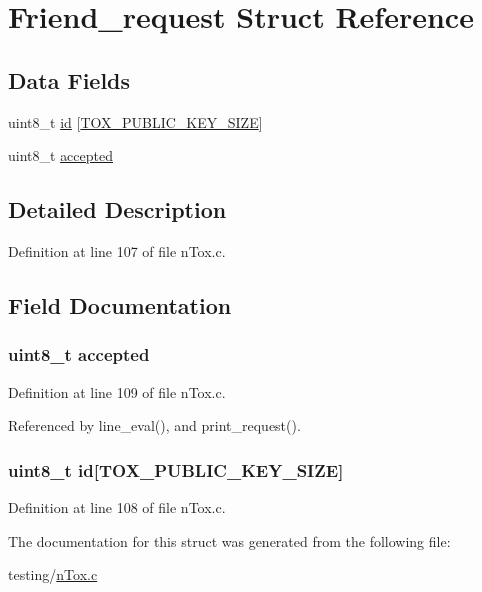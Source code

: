 \hypertarget{struct_friend__request}{\section{Friend\+\_\+request Struct Reference}
\label{struct_friend__request}
}
\subsection*{Data Fields}
\begin{DoxyCompactItemize}
\item 
uint8\+\_\+t \hyperlink{struct_friend__request_aca2bb72adf3445dbc7d501753fc2396d}{id} \mbox{[}\hyperlink{tox_8h_a6a25b8b522f6d65bacd1d84981b8c75c}{T\+O\+X\+\_\+\+P\+U\+B\+L\+I\+C\+\_\+\+K\+E\+Y\+\_\+\+S\+I\+Z\+E}\mbox{]}
\item 
uint8\+\_\+t \hyperlink{struct_friend__request_a41a8f1919b834fd7e1d1e48aa06c09a8}{accepted}
\end{DoxyCompactItemize}


\subsection{Detailed Description}


Definition at line 107 of file n\+Tox.\+c.



\subsection{Field Documentation}
\hypertarget{struct_friend__request_a41a8f1919b834fd7e1d1e48aa06c09a8}{
\subsubsection[{accepted}]{\setlength{\rightskip}{0pt plus 5cm}uint8\+\_\+t accepted}}\label{struct_friend__request_a41a8f1919b834fd7e1d1e48aa06c09a8}


Definition at line 109 of file n\+Tox.\+c.



Referenced by line\+\_\+eval(), and print\+\_\+request().

\hypertarget{struct_friend__request_aca2bb72adf3445dbc7d501753fc2396d}{
\subsubsection[{id}]{\setlength{\rightskip}{0pt plus 5cm}uint8\+\_\+t id\mbox{[}{\bf T\+O\+X\+\_\+\+P\+U\+B\+L\+I\+C\+\_\+\+K\+E\+Y\+\_\+\+S\+I\+Z\+E}\mbox{]}}}\label{struct_friend__request_aca2bb72adf3445dbc7d501753fc2396d}


Definition at line 108 of file n\+Tox.\+c.



The documentation for this struct was generated from the following file\+:\begin{DoxyCompactItemize}
\item 
testing/\hyperlink{n_tox_8c}{n\+Tox.\+c}\end{DoxyCompactItemize}
